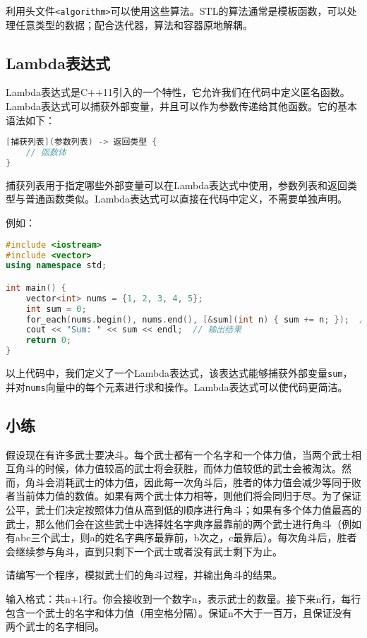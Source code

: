 \documentclass[../main.tex]{subfiles}
\begin{document}
利用头文件\texttt{<algorithm>}可以使用这些算法。STL的算法通常是模板函数，可以处理任意类型的数据；配合迭代器，算法和容器原地解耦。

\subsection{Lambda表达式}

Lambda表达式是C++11引入的一个特性，它允许我们在代码中定义匿名函数。Lambda表达式可以捕获外部变量，并且可以作为参数传递给其他函数。它的基本语法如下：
\begin{lstlisting}[language=C++]
[捕获列表](参数列表) -> 返回类型 {
    // 函数体
}
\end{lstlisting}
捕获列表用于指定哪些外部变量可以在Lambda表达式中使用，参数列表和返回类型与普通函数类似。Lambda表达式可以直接在代码中定义，不需要单独声明。

例如：
\begin{lstlisting}[language=C++]
#include <iostream>
#include <vector>
using namespace std;

int main() {
    vector<int> nums = {1, 2, 3, 4, 5};
    int sum = 0;
    for_each(nums.begin(), nums.end(), [&sum](int n) { sum += n; });  // 使用Lambda表达式计算总和
    cout << "Sum: " << sum << endl;  // 输出结果
    return 0;
}
\end{lstlisting}
以上代码中，我们定义了一个Lambda表达式，该表达式能够捕获外部变量\texttt{sum}，并对\texttt{nums}向量中的每个元素进行求和操作。Lambda表达式可以使代码更简洁。

\subsection{小练}

假设现在有许多武士要决斗。每个武士都有一个名字和一个体力值，当两个武士相互角斗的时候，体力值较高的武士将会获胜，而体力值较低的武士会被淘汰。然而，角斗会消耗武士的体力值，因此每一次角斗后，胜者的体力值会减少等同于败者当前体力值的数值。如果有两个武士体力相等，则他们将会同归于尽。为了保证公平，武士们决定按照体力值从高到低的顺序进行角斗；如果有多个体力值最高的武士，那么他们会在这些武士中选择姓名字典序最靠前的两个武士进行角斗（例如有abc三个武士，则a的姓名字典序最靠前，b次之，c最靠后）。每次角斗后，胜者会继续参与角斗，直到只剩下一个武士或者没有武士剩下为止。

请编写一个程序，模拟武士们的角斗过程，并输出角斗的结果。

输入格式：共n+1行。你会接收到一个数字n，表示武士的数量。接下来n行，每行包含一个武士的名字和体力值（用空格分隔）。保证n不大于一百万，且保证没有两个武士的名字相同。
\end{document}
